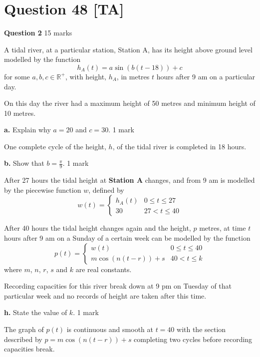 \documentclass[10pt,a4paper]{article}
\begin{document}
\section*{Question 48 [TA]}

\textbf{Question 2} \hfill 15 marks

A tidal river, at a particular station, Station A, has its height above ground level modelled by the function
\[
h_A(t) = a\sin(b(t-18)) + c
\]
for some $a, b, c \in \mathbb{R}^+$, with height, $h_A$, in metres $t$ hours after 9 am on a particular day.

On this day the river had a maximum height of 50 metres and minimum height of 10 metres.

\textbf{a.} Explain why $a = 20$ and $c = 30$. \hfill 1 mark

\vspace{9\baselineskip}

One complete cycle of the height, $h$, of the tidal river is completed in 18 hours.

\textbf{b.} Show that $b = \frac{\pi}{9}$. \hfill 1 mark

\vspace{9\baselineskip}

After 27 hours the tidal height at \textbf{Station A} changes, and from 9 am is modelled by the piecewise function $w$, defined by
\[
w(t) = \begin{cases}
h_A(t) & 0 \leq t \leq 27 \\
30 & 27 < t \leq 40
\end{cases}
\]

After 40 hours the tidal height changes again and the height, $p$ metres, at time $t$ hours after 9 am on a Sunday of a certain week can be modelled by the function
\[
p(t) = \begin{cases}
w(t) & 0 \leq t \leq 40 \\
m\cos(n(t-r)) + s & 40 < t \leq k
\end{cases}
\]
where $m$, $n$, $r$, $s$ and $k$ are real constants.

Recording capacities for this river break down at 9 pm on Tuesday of that particular week and no records of height are taken after this time.

\textbf{h.} State the value of $k$. \hfill 1 mark

\vspace{9\baselineskip}

The graph of $p(t)$ is continuous and smooth at $t = 40$ with the section described by $p = m\cos(n(t-r)) + s$ completing two cycles before recording capacities break.
\end{document}
